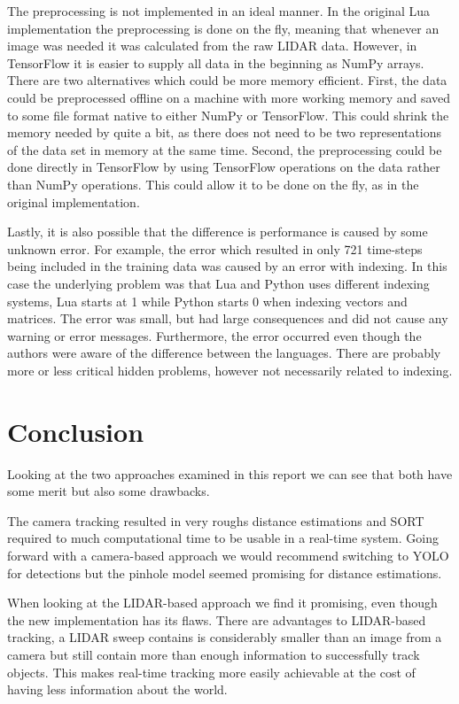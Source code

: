 \documentclass[a4paper]{article}
\begin{document}
The preprocessing is not implemented in an ideal manner.
In the original Lua implementation the preprocessing is done on the fly, meaning that whenever an image was needed it was calculated from the raw LIDAR data.
However, in TensorFlow it is easier to supply all data in the beginning as NumPy arrays.
There are two alternatives which could be more memory efficient.
First, the data could be preprocessed offline on a machine with more working memory and saved to some file format native to either NumPy or TensorFlow.
This could shrink the memory needed by quite a bit, as there does not need to be two representations of the data set in memory at the same time.
Second, the preprocessing could be done directly in TensorFlow by using TensorFlow operations on the data rather than NumPy operations.
This could allow it to be done on the fly, as in the original implementation.

Lastly, it is also possible that the difference is performance is caused by some unknown error.
For example, the error which resulted in only 721 time-steps being included in the training data was caused by an error with indexing.
In this case the underlying problem was that Lua and Python uses different indexing systems, Lua starts at 1 while Python starts 0 when indexing vectors and matrices.
The error was small, but had large consequences and did not cause any warning or error messages.
Furthermore, the error occurred even though the authors were aware of the difference between the languages.
There are probably more or less critical hidden problems, however not necessarily related to indexing.

\section{Conclusion}

Looking at the two approaches examined in this report we can see that both have some merit but also some drawbacks.

The camera tracking resulted in very roughs distance estimations and SORT required to much computational time to be usable in a real-time system. Going forward with a camera-based approach we would recommend switching to YOLO for detections but the pinhole model seemed promising for distance estimations.

When looking at the LIDAR-based approach we find it promising, even though the new implementation has its flaws.
There are advantages to LIDAR-based tracking, a LIDAR sweep contains is considerably smaller than an image from a camera but still contain more than enough information to successfully track objects.
This makes real-time tracking more easily achievable at the cost of having less information about the world.

\printbibliography
\end{document}
